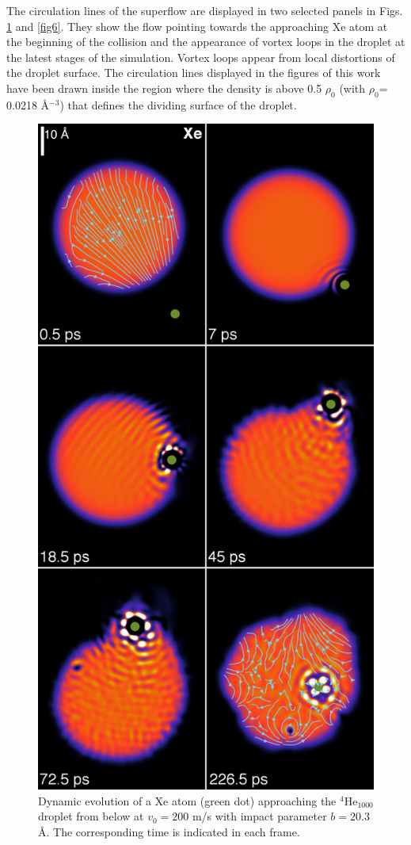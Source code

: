  The circulation lines of the superflow are displayed 
in two selected panels in Figs. \ref{fig5} and \ref{fig6}. 
They show the flow  pointing towards
the approaching Xe atom at the beginning of the collision and the appearance of vortex loops  
in the droplet at the latest stages of the simulation.
Vortex loops appear  from local distortions of the droplet surface.\cite{Lea14b} 
The circulation lines  displayed  in the figures of this work have been drawn inside the region where the density is above  0.5 $\rho_0$ (with $\rho_0$= 0.0218 \AA$^{-3}$)
 that defines the dividing surface of the droplet. 

\begin{figure}[h]
\centerline{\includegraphics[width=0.60\linewidth,clip]{xehe200-b203-composed}}
\caption{\label{fig5} 
Dynamic evolution of a Xe atom (green dot) approaching the $^4$He$_{1000}$ 
droplet from below at $v_0 = 200$ m/s with impact parameter $b = 20.3$ \AA{}. The corresponding time is indicated in each frame.\cite{ESI} 
}
\end{figure}
%

